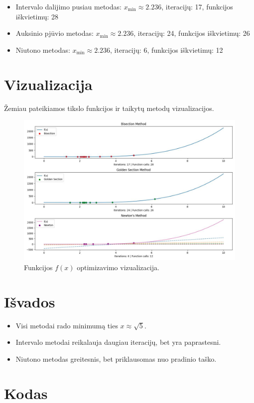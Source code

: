 \documentclass[a4paper,12pt]{article}
\begin{document}
\begin{itemize}
    \item Intervalo dalijimo pusiau metodas: 
        $x_{\min} \approx 2.236$, iteracijų: 17, funkcijos iškvietimų: 28
    \item Auksinio pjūvio metodas:
        $x_{\min} \approx 2.236$, iteracijų: 24, funkcijos iškvietimų: 26
    \item Niutono metodas:
        $x_{\min} \approx 2.236$, iteracijų: 6, funkcijos iškvietimų: 12
\end{itemize}

\section{Vizualizacija}
Žemiau pateikiamos tikslo funkcijos ir taikytų metodų vizualizacijos.

\begin{figure}[H]
    \centering
    \includegraphics[width=\textwidth]{figure-1.jpeg}
    \caption{\label{fig:all}Funkcijos $f(x)$ optimizavimo vizualizacija.}
\end{figure}

\section{Išvados}
\begin{itemize}
    \item Visi metodai rado minimumą ties $x \approx \sqrt{5}$.
    \item Intervalo metodai reikalauja daugiau iteracijų, bet yra paprastesni.
    \item Niutono metodas greitesnis, bet priklausomas nuo pradinio taško.
\end{itemize}

\section{Kodas}

\end{document}
